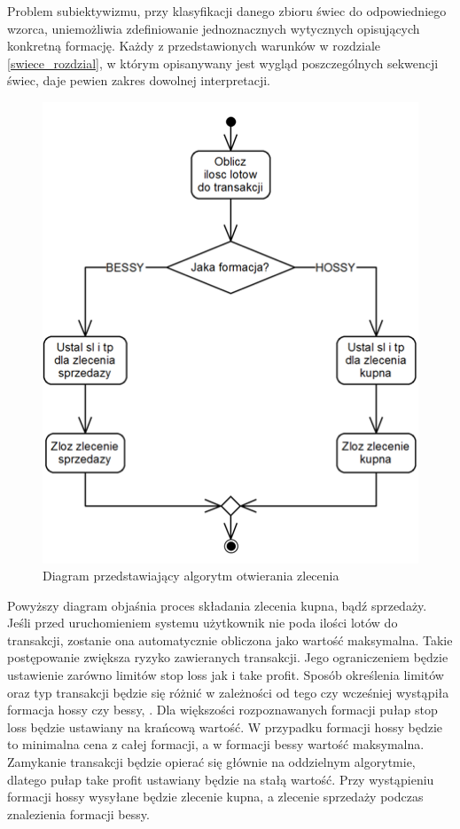 \documentclass[pdflatex,11pt]{aghdpl}
\begin{document}
Problem subiektywizmu, przy klasyfikacji danego zbioru świec do odpowiedniego wzorca, uniemożliwia zdefiniowanie jednoznacznych wytycznych opisujących konkretną formację. Każdy z przedstawionych warunków w rozdziale \ref{swiece_rozdzial}, w którym opisanywany jest wygląd poszczególnych sekwencji świec, daje pewien zakres dowolnej interpretacji. 

\begin{figure}[H]
\begin{center}
\includegraphics[width=12cm]{otwarcie.png}
\caption{Diagram przedstawiający algorytm otwierania zlecenia}
\label{otwarcie}
\end{center}
\end{figure} 

Powyższy diagram objaśnia proces składania zlecenia kupna, bądź sprzedaży. Jeśli przed uruchomieniem systemu użytkownik nie poda ilości lotów do transakcji, zostanie ona automatycznie obliczona jako wartość maksymalna. Takie postępowanie zwiększa ryzyko zawieranych transakcji. Jego ograniczeniem będzie ustawienie zarówno limitów stop loss jak i take profit. Sposób określenia limitów oraz typ transakcji będzie się różnić w zależności od tego czy wcześniej wystąpiła formacja hossy czy bessy, . Dla większości rozpoznawanych formacji pułap stop loss będzie ustawiany na krańcową wartość. W przypadku formacji hossy będzie to minimalna cena z całej formacji, a w formacji bessy wartość maksymalna. Zamykanie transakcji będzie opierać się głównie na oddzielnym algorytmie, dlatego pułap take profit ustawiany będzie na stałą wartość. Przy wystąpieniu formacji hossy wysyłane będzie zlecenie kupna, a zlecenie sprzedaży podczas znalezienia formacji bessy.   
\end{document}
